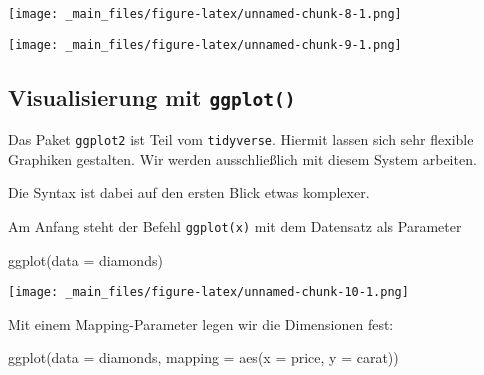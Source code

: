 \documentclass[
  ngerman,
]{article}
\newenvironment{Shaded}{\begin{snugshade}}{\end{snugshade}}
\newcommand{\AttributeTok}[1]{\textcolor[rgb]{0.77,0.63,0.00}{#1}}
\newcommand{\FunctionTok}[1]{\textcolor[rgb]{0.00,0.00,0.00}{#1}}
\newcommand{\NormalTok}[1]{#1}
\newcommand{\SpecialCharTok}[1]{\textcolor[rgb]{0.00,0.00,0.00}{#1}}
\begin{document}
\begin{Shaded}
\end{Shaded}

\texttt{[image: \_main\_files/figure-latex/unnamed-chunk-8-1.png]}

\begin{Shaded}
\end{Shaded}

\texttt{[image: \_main\_files/figure-latex/unnamed-chunk-9-1.png]}

\hypertarget{visualisierung-mit-ggplot}{%
\subsection{\texorpdfstring{Visualisierung mit \texttt{ggplot()}}{Visualisierung mit ggplot()}}\label{visualisierung-mit-ggplot}}

Das Paket \texttt{ggplot2} ist Teil vom \texttt{tidyverse}. Hiermit lassen sich sehr flexible Graphiken gestalten. Wir werden ausschließlich mit diesem System arbeiten.

Die Syntax ist dabei auf den ersten Blick etwas komplexer.

Am Anfang steht der Befehl \texttt{ggplot(x)} mit dem Datensatz als Parameter

\begin{Shaded}
\begin{Highlighting}[]
\FunctionTok{ggplot}\NormalTok{(}\AttributeTok{data =}\NormalTok{ diamonds)}
\end{Highlighting}
\end{Shaded}

\texttt{[image: \_main\_files/figure-latex/unnamed-chunk-10-1.png]}

Mit einem Mapping-Parameter legen wir die Dimensionen fest:

\begin{Shaded}
\begin{Highlighting}[]
\FunctionTok{ggplot}\NormalTok{(}\AttributeTok{data =}\NormalTok{ diamonds, }\AttributeTok{mapping =} \FunctionTok{aes}\NormalTok{(}\AttributeTok{x =}\NormalTok{ price, }\AttributeTok{y =}\NormalTok{ carat))}
\end{Highlighting}
\end{Shaded}
\end{document}
